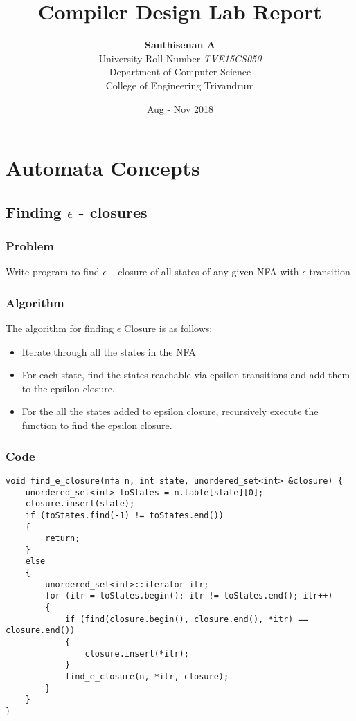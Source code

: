 \documentclass[a4paper, 12pt]{report}
\begin{document}
    \title{Compiler Design Lab Report}
    \author{
        \Large{\textbf{Santhisenan A}} \\
        University Roll Number \textit{TVE15CS050} \\ 
        Department of Computer Science \\
        College of Engineering Trivandrum \\}
    \date{Aug - Nov 2018}
    \maketitle
    \newpage

    \chapter{Automata Concepts}

    \section{Finding $\epsilon$ - closures }
    \subsection{Problem}
    Write program to find $\epsilon$ – closure of all states of 
    any given NFA with $\epsilon$ transition
    \subsection{Algorithm}
    The algorithm for finding $\epsilon$ Closure is as follows:
    \begin{itemize}
        \item{Iterate through all the states in the NFA}
        \item{For each state, find the states reachable via epsilon transitions
        and add them to the epsilon closure.}
        \item{For the all the states added to epsilon closure, recursively 
        execute the function to find the epsilon closure.}
    \end{itemize}

    \subsection{Code}
    \begin{verbatim}
void find_e_closure(nfa n, int state, unordered_set<int> &closure) {
    unordered_set<int> toStates = n.table[state][0];
    closure.insert(state);
    if (toStates.find(-1) != toStates.end())
    {
        return;
    }
    else
    {
        unordered_set<int>::iterator itr;
        for (itr = toStates.begin(); itr != toStates.end(); itr++)
        {
            if (find(closure.begin(), closure.end(), *itr) == closure.end())
            {
                closure.insert(*itr);
            }
            find_e_closure(n, *itr, closure);
        }
    }
}
    \end{verbatim}
    \newpage
    
\end{document}
